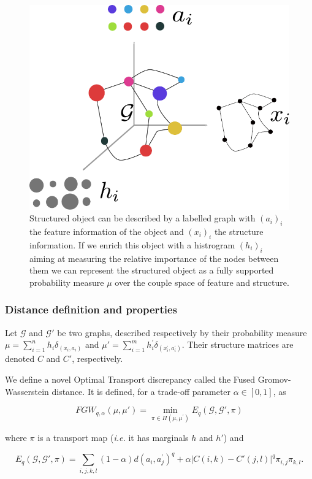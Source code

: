 \begin{figure}
\centering
\includegraphics[width=.4\textwidth]{fig/graph_as_distrib}
\caption{Structured object can be described by a labelled graph with $(a_{i})_{i}$ the feature information of the object and $(x_{i})_{i}$ the structure information.
If we enrich this object with a histrogram $(h_{i})_{i}$ aiming at measuring the relative importance of the nodes between them we can represent the structured object as a fully supported probability measure $\mu$ over the couple space of feature and structure. \label{fig:graph}}
\end{figure}

\subsubsection{Distance definition and properties}

Let $\mathcal{G}$ and $\mathcal{G}'$ be two graphs, described respectively
by their probability measure $\mu= \sum_{i=1}^{n} h_{i} \delta_{(x_{i},a_{i})}$
and $\mu' = \sum_{i=1}^{m} h^\prime_i \delta_{(x^\prime_i,a^\prime_i)}$.
Their structure matrices are denoted $C$ and $C'$, respectively.


We define a novel Optimal Transport discrepancy called the
Fused Gromov-Wasserstein distance.
It is defined, for a trade-off parameter  $\alpha \in [0,1]$, as

\begin{equation}
\label{discretefgw}
FGW_{q, \alpha} (\mu, \mu') = \min_{\pi \in \Pi(\mu, \mu^\prime)}
    E_{q}(\mathcal{G}, \mathcal{G}', \pi)
\end{equation}

where $\pi$ is a transport map (\emph{i.e.} it has marginals $h$ and $h'$) and

\begin{equation}
E_{q}(\mathcal{G}, \mathcal{G}', \pi) =
    \sum_{i,j,k,l} (1-\alpha) d(a_{i},a^\prime_j)^{q}
                    +\alpha |C(i,k)-C'(j,l)|^{q} \pi_{i,j}\pi_{k,l} .
\end{equation}

